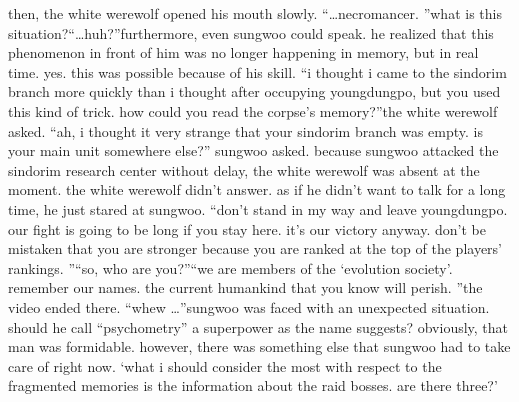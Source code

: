 then, the white werewolf opened his mouth slowly.
“…necromancer.
”what is this situation?“…huh?”furthermore, even sungwoo could speak.
 he realized that this phenomenon in front of him was no longer happening in memory, but in real time.
yes.
 this was possible because of his skill.
“i thought i came to the sindorim branch more quickly than i thought after occupying youngdungpo, but you used this kind of trick.
 how could you read the corpse’s memory?”the white werewolf asked.
“ah, i thought it very strange that your sindorim branch was empty.
 is your main unit somewhere else?” sungwoo asked.
because sungwoo attacked the sindorim research center without delay, the white werewolf was absent at the moment.
the white werewolf didn’t answer.
 as if he didn’t want to talk for a long time, he just stared at sungwoo.
“don’t stand in my way and leave youngdungpo.
 our fight is going to be long if you stay here.
 it’s our victory anyway.
 don’t be mistaken that you are stronger because you are ranked at the top of the players’ rankings.
”“so, who are you?”“we are members of the ‘evolution society’.
 remember our names.
 the current humankind that you know will perish.
”the video ended there.
“whew …”sungwoo was faced with an unexpected situation.
 should he call “psychometry” a superpower as the name suggests? obviously, that man was formidable.
however, there was something else that sungwoo had to take care of right now.
‘what i should consider the most with respect to the fragmented memories is the information about the raid bosses.
 are there three?’

 